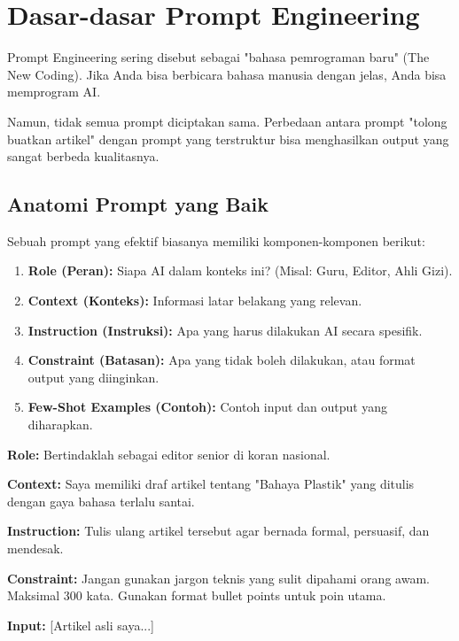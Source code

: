 \chapter{Dasar-dasar Prompt Engineering}
\label{chap:prompting}

Prompt Engineering sering disebut sebagai "bahasa pemrograman baru" (The New Coding). Jika Anda bisa berbicara bahasa manusia dengan jelas, Anda bisa memprogram AI.

Namun, tidak semua prompt diciptakan sama. Perbedaan antara prompt "tolong buatkan artikel" dengan prompt yang terstruktur bisa menghasilkan output yang sangat berbeda kualitasnya.

\section{Anatomi Prompt yang Baik}

Sebuah prompt yang efektif biasanya memiliki komponen-komponen berikut:

\begin{enumerate}
    \item \textbf{Role (Peran):} Siapa AI dalam konteks ini? (Misal: Guru, Editor, Ahli Gizi).
    \item \textbf{Context (Konteks):} Informasi latar belakang yang relevan.
    \item \textbf{Instruction (Instruksi):} Apa yang harus dilakukan AI secara spesifik.
    \item \textbf{Constraint (Batasan):} Apa yang tidak boleh dilakukan, atau format output yang diinginkan.
    \item \textbf{Few-Shot Examples (Contoh):} Contoh input dan output yang diharapkan.
\end{enumerate}

\begin{promptbox}[title=Contoh Prompt Terstruktur]
\textbf{Role:} Bertindaklah sebagai editor senior di koran nasional.

\textbf{Context:} Saya memiliki draf artikel tentang "Bahaya Plastik" yang ditulis dengan gaya bahasa terlalu santai.

\textbf{Instruction:} Tulis ulang artikel tersebut agar bernada formal, persuasif, dan mendesak.

\textbf{Constraint:} Jangan gunakan jargon teknis yang sulit dipahami orang awam. Maksimal 300 kata. Gunakan format bullet points untuk poin utama.

\textbf{Input:} [Artikel asli saya...]
\end{promptbox}

